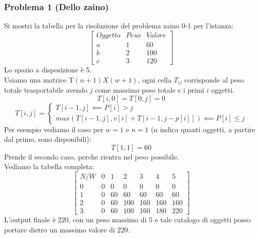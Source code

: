 \documentclass[a4paper,12pt]{article}
\begin{document}
\subsubsection{Problema 1 (Dello zaino)}
Si mostri la tabella per la risoluzione del problema zaino 0-1 per l'istanza:
\[
\begin{bmatrix}
    Oggetto & Peso & Valore\\
    a & 1 & 60\\
    b & 2 & 100\\
    c & 3 & 120
\end{bmatrix}
\]
Lo spazio a disposizione è 5.\\
Usiamo una matrice T$(n+1) X (w+1)$, ogni cella $T_{ij}$ corrisponde al peso totale trasportabile avendo $j$ come massimo peso totale e i primi $i$ oggetti.
\[
T[i,0] = T[0,j] = 0
\]
\[
T[i,j] = \begin{cases}
    T[i-1,j] \impliedby P[i] > j\\
    max(T[i-1,j],v[i] + T[i-1,j - p[i]]) \impliedby P[i] \leq j
\end{cases}
\]
Per esempio vediamo il caso per $w = 1$ e $n = 1$ (n indica quanti oggetti, a partire dal primo, sono disponibili):
\[
T[1,1] = 60
\]
Prende il secondo caso, perche rientra nel peso possibile.\\
Vediamo la tabella completa:
\[
\begin{bmatrix}
    N / W & 0 & 1 & 2 & 3 & 4 & 5\\
    0 & 0 & 0 & 0 & 0 & 0 & 0\\
    1 & 0 & 60 & 60 & 60 & 60 & 60 \\
    2 & 0 & 60 & 100 & 160 & 160 & 160\\
    3 & 0 & 60 & 100 & 160 & 180 & 220
\end{bmatrix}
\]
L'output finale è $220$, con un peso massimo di $5$ e tale catalogo di oggetti posso portare dietro un massimo valore di $220$.
\end{document}
